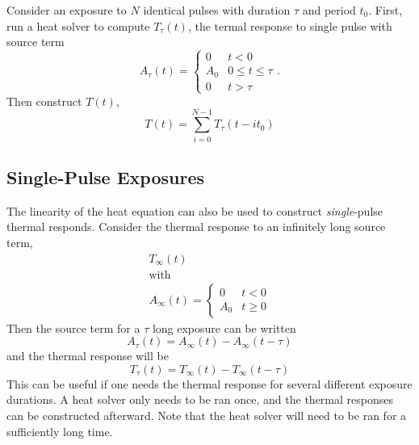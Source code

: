 \documentclass[letterpaper,10pt]{article}
\begin{document}
Consider an exposure to $N$ identical pulses with duration $\tau$ and period $t_0$. First, run a heat solver
to compute $T_\tau(t)$, the termal response to single pulse with source term
\begin{equation}
A_\tau(t) = \begin{cases}
  0 & t < 0 \\
  A_0 & 0 \le t \le \tau \\
  0 & t > \tau
\end{cases}.
\end{equation}
Then construct $T(t)$,
\begin{equation}
  T(t) = \sum\limits_{i = 0}^{N-1} T_\tau(t - it_0)
\end{equation}



\subsection{Single-Pulse Exposures}
\label{sub:single_pulse_exposure}

The linearity of the heat equation can also be used to construct \emph{single}-pulse thermal responds. Consider
the thermal response to an infinitely long source term,
\begin{align}
  T_\infty(t) \\
  \text{with} \\
  A_\infty(t) = \begin{cases}
    0 & t < 0 \\
    A_0 & t \ge 0
  \end{cases}
\end{align}
Then the source term for a $\tau$ long exposure can be written
\begin{equation}
  A_\tau(t) = A_\infty(t) - A_\infty(t - \tau)
\end{equation}
and the thermal response will be
\begin{equation}
  T_\tau(t) = T_\infty(t) - T_\infty(t - \tau)
\end{equation}
This can be useful if one needs the thermal response for several different exposure durations. A heat solver
only needs to be ran once, and the thermal responses can be constructed afterward. Note that the heat solver
will need to be ran for a sufficiently long time.
\end{document}
